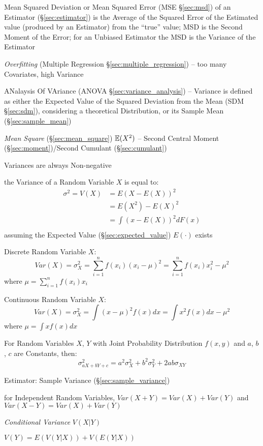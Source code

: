 \fist Mean Squared Deviation or Mean Squared Error (MSE \S\ref{sec:msd}) of an
Estimator (\S\ref{sec:estimator}) is the Average of the Squared Error of the
Estimated value (produced by an Estimator) from the ``true'' value; MSD is
the Second Moment of the Error; for an Unbiased Estimator the MSD is the
Variance of the Estimator

\emph{Overfitting} (Multiple Regression \S\ref{sec:multiple_regression}) -- too
many Covariates, high Variance

\fist ANalaysis Of VAriance (ANOVA \S\ref{sec:variance_analysis}) --
Variance is defined as either the Expected Value of the
Squared Deviation from the Mean (SDM \S\ref{sec:sdm}), considering a theoretical
Distribution, or its Sample Mean (\S\ref{sec:sample_mean})

\emph{Mean Square} (\S\ref{sec:mean_square}) $\mathbb{E}(X^2)$ -- Second Central
Moment (\S\ref{sec:moment})/Second Cumulant (\S\ref{sec:cumulant})

Variances are always Non-negative

the Variance of a Random Variable $X$ is equal to:
\begin{align*}
  \sigma^2 = V(X) & = E(X - E(X))^2   \\
                  & = E(X^2) - E(X)^2 \\
                  & = \int(x - E(X))^2 dF(x) \\
\end{align*}
assuming the Expected Value (\S\ref{sec:expected_value}) $E(\cdot)$ exists

Discrete Random Variable $X$:
\[
  Var(X) = \sigma_X^2 = \sum_{i=1}^n f(x_i) (x_i - \mu)^2 = \sum_{i=1}^n
  f(x_i) x_i^2 - \mu^2
\]
where $\mu = \sum_{i=1}^n f(x_i) x_i$

Continuous Random Variable $X$:
\[
  Var(X) = \sigma_X^2 = \int (x - \mu)^2 f(x) dx = \int x^2 f(x) dx -
  \mu^2
\]
where $\mu = \int x f(x) dx$

For Random Variables $X$, $Y$ with Joint Probability Distribution
$f(x,y)$ and $a$, $b$, $c$ are Constants, then:
\[
  \sigma^2_{a X + b Y + c} = a^2 \sigma^2_X + b^2 \sigma^2_Y + 2ab
  \sigma_{X Y}
\]

\fist Estimator: Sample Variance (\S\ref{sec:sample_variance})

for Independent Random Variables, $Var(X + Y) = Var(X) + Var(Y)$ and
$Var(X - Y) = Var(X) + Var(Y)$

\emph{Conditional Variance} $V(X|Y)$

$V(Y) = E(V(Y|X)) + V(E(Y|X))$

